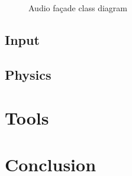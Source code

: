 \documentclass{projdoc}
\begin{document}
\begin{figure}
	\centering
	\caption{Audio fa\c{c}ade class diagram}
	\label{fig:class-audio-facade}
\end{figure}

\subsection{Input}

\subsection{Physics}

\section{Tools}

\section{Conclusion}
\end{document}
